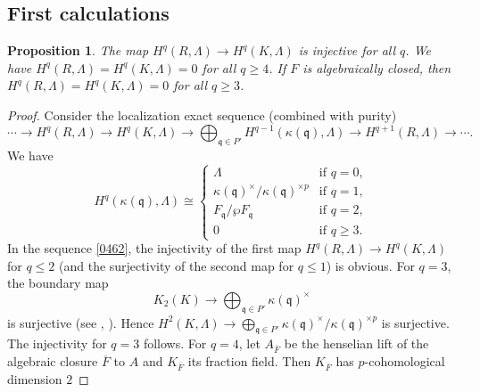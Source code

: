 \documentclass{amsart}
\newtheorem{Prop}[Thm]{Proposition}
\theoremstyle{remark}
\numberwithin{equation}{subsection}
\newcommand{\closure}[1]{\overline{#1}}
\newcommand{\ideal}[1]{\mathfrak{#1}}
\begin{document}

\subsection{First calculations}
\label{0310}

\begin{Prop} \label{0063}
	The map
	$H^{q}(R, \Lambda) \to H^{q}(K, \Lambda)$
	is injective for all $q$.
	We have $H^{q}(R, \Lambda) = H^{q}(K, \Lambda) = 0$ for all $q \ge 4$.
	If $F$ is algebraically closed, then
	$H^{q}(R, \Lambda) = H^{q}(K, \Lambda) = 0$ for all $q \ge 3$.
\end{Prop}

\begin{proof}
	Consider the localization exact sequence (combined with purity)
		\begin{equation} \label{0462}
				\cdots
			\to
				H^{q}(R, \Lambda)
			\to
				H^{q}(K, \Lambda)
			\to
				\bigoplus_{\ideal{q} \in P'}
				H^{q - 1}(\kappa(\ideal{q}), \Lambda)
			\to
				H^{q + 1}(R, \Lambda)
			\to
				\cdots.
		\end{equation}
	We have
		\[
				H^{q}(\kappa(\ideal{q}), \Lambda)
			\cong
				\begin{cases}
						\Lambda
					&	\text{if }
						q = 0,
					\\
						\kappa(\ideal{q})^{\times} / \kappa(\ideal{q})^{\times p}
					&	\text{if }
						q = 1,
					\\
						F_{\ideal{q}} / \wp F_{\ideal{q}}
					&	\text{if }
						q = 2,
					\\
						0
					&	\text{if }
						q \ge 3.
				\end{cases}
		\]
	In the sequence \eqref{0462},
	the injectivity of the first map $H^{q}(R, \Lambda) \to H^{q}(K, \Lambda)$ for $q \le 2$
	(and the surjectivity of the second map for $q \le 1$) is obvious.
	For $q = 3$, the boundary map
		\[
				K_{2}(K)
			\to
				\bigoplus_{\ideal{q} \in P'}
					\kappa(\ideal{q})^{\times}
		\]
	is surjective (see \cite[Chapter V, (6.6.1)]{Wei13}, \cite[Lemma (1.16)]{Sai87}).
	Hence
		$
				H^{2}(K, \Lambda)
			\to
				\bigoplus_{\ideal{q} \in P'}
					\kappa(\ideal{q})^{\times} / \kappa(\ideal{q})^{\times p}
		$
	is surjective.
	The injectivity for $q = 3$ follows.
	For $q = 4$, let $A_{\closure{F}}$ be the henselian lift
	of the algebraic closure $\closure{F}$ to $A$
	and $K_{\closure{F}}$ its fraction field.
	Then $K_{\closure{F}}$ has $p$-cohomological dimension $2$

\end{proof}
\end{document}
